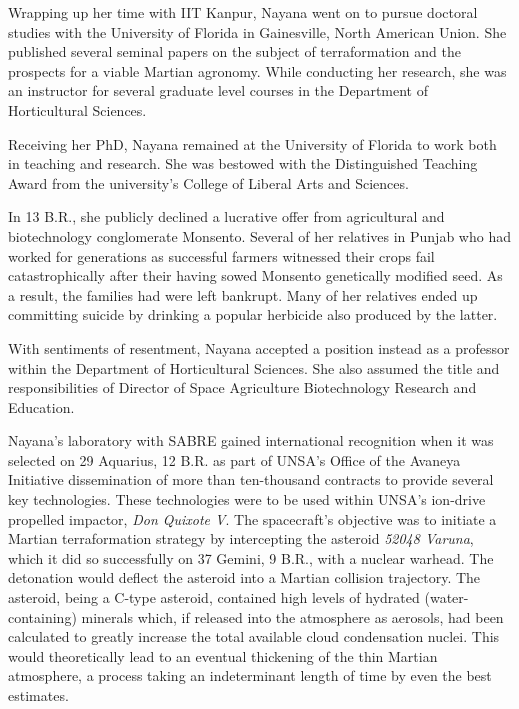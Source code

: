 Wrapping up her time with IIT Kanpur, Nayana went on to pursue doctoral studies with the University of Florida in Gainesville, North American Union. She published several seminal papers on the subject of terraformation and the prospects for a viable Martian agronomy. While conducting her research, she was an instructor for several graduate level courses in the Department of Horticultural Sciences.

Receiving her PhD, Nayana remained at the University of Florida to work both in teaching and research. She was bestowed with the Distinguished Teaching Award from the university's College of Liberal Arts and Sciences. 

In 13 B.R., she publicly declined a lucrative offer from agricultural and biotechnology conglomerate Monsento. Several of her relatives in Punjab who had worked for generations as successful farmers witnessed their crops fail catastrophically after their having sowed Monsento genetically modified seed. As a result, the families had were left bankrupt. Many of her relatives ended up committing suicide by drinking a popular herbicide also produced by the latter. 

With sentiments of resentment, Nayana accepted a position instead as a professor within the Department of Horticultural Sciences. She also assumed the title and responsibilities of Director of Space Agriculture Biotechnology Research and Education.

Nayana's laboratory with SABRE gained international recognition when it was selected on 29 Aquarius, 12 B.R. as part of UNSA's Office of the Avaneya Initiative dissemination of more than ten-thousand contracts to provide several key technologies. These technologies were to be used within UNSA's ion-drive propelled impactor, {\it Don Quixote V}. The spacecraft's objective was to initiate a Martian terraformation strategy by intercepting the asteroid {\it 52048 Varuna}, which it did so successfully on 37 Gemini, 9 B.R., with a nuclear warhead. The detonation would deflect the asteroid into a Martian collision trajectory. The asteroid, being a C-type asteroid, contained high levels of hydrated (water-containing) minerals which, if released into the atmosphere as aerosols, had been calculated to greatly increase the total available cloud condensation nuclei. This would theoretically lead to an eventual thickening of the thin Martian atmosphere, a process taking an indeterminant length of time by even the best estimates.

